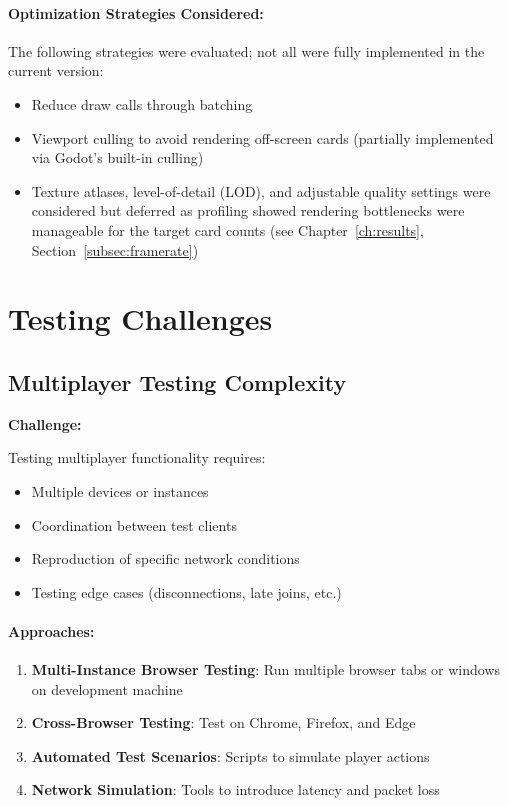 \paragraph*{Optimization Strategies Considered:}

The following strategies were evaluated; not all were fully implemented in the current version:
\begin{itemize}
    \item Reduce draw calls through batching
    \item Viewport culling to avoid rendering off-screen cards (partially implemented via Godot's built-in culling)
    \item Texture atlases, level-of-detail (LOD), and adjustable quality settings were considered but deferred as profiling showed rendering bottlenecks were manageable for the target card counts (see Chapter~\ref{ch:results}, Section~\ref{subsec:framerate})
\end{itemize}

\section{Testing Challenges}
\label{sec:testing-challenges}

\subsection{Multiplayer Testing Complexity}
\label{subsec:multiplayer-testing}

\textbf{Challenge:}

Testing multiplayer functionality requires:
\begin{itemize}
    \item Multiple devices or instances
    \item Coordination between test clients
    \item Reproduction of specific network conditions
    \item Testing edge cases (disconnections, late joins, etc.)
\end{itemize}

\paragraph*{Approaches:}

\begin{enumerate}
    \item \textbf{Multi-Instance Browser Testing}: Run multiple browser tabs or windows on development machine
    \item \textbf{Cross-Browser Testing}: Test on Chrome, Firefox, and Edge
    \item \textbf{Automated Test Scenarios}: Scripts to simulate player actions
    \item \textbf{Network Simulation}: Tools to introduce latency and packet loss
\end{enumerate}

